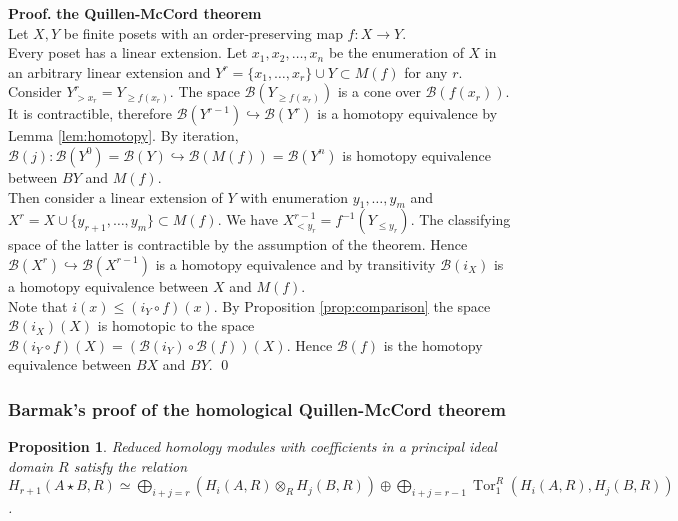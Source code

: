 \documentclass[english,12pt]{article}
\newcounter{stmcounter}[section]
\numberwithin{equation}{section}
\newtheorem{proposition}[stmcounter]{Proposition}
\theoremstyle{definition}
\theoremstyle{remark}
\newenvironment{pf}{\noindent\textbf{Proof.}}{\qed}
\renewcommand{\geq}{\geqslant}
\begin{document}
\begin{pf} \textbf{the Quillen-McCord theorem}\\
  Let $X, Y$ be finite posets with an order-preserving map $f : X \to Y$.\\

  Every poset has a linear extension. Let $x_1, x_2, \ldots, x_n$ be the enumeration of $X$ in an arbitrary linear extension and $Y^r = \{x_1,\ldots,x_r\} \cup Y \subset M(f)$ for any $r$.\\

  Consider $Y^r_{>x_r} = Y_{\geq f(x_r)}$. The space $\mathcal{B}(Y_{\geq f(x_r)})$ is a cone over $\mathcal{B}(f(x_r))$. It is contractible, therefore $\mathcal{B}(Y^{r-1}) \hookrightarrow \mathcal{B}(Y^{r})$ is a homotopy equivalence by Lemma \ref{lem:homotopy}. By iteration, $\mathcal{B}(j) : \mathcal{B}(Y^{0}) = \mathcal{B}(Y) \hookrightarrow \mathcal{B}(M(f)) = \mathcal{B}(Y^n)$ is homotopy equivalence between $BY$ and $M(f)$.\\

  Then consider a linear extension of $Y$ with enumeration $y_1,\ldots,y_m$ and $X^r = X \cup \{y_{r+1},\ldots,y_m\} \subset M(f)$. We have $X^{r-1}_{< y_r} = f^{-1}(Y_{\leqslant y_r})$. The classifying space of the latter is contractible by the assumption of the theorem. Hence $\mathcal{B}(X^{r}) \hookrightarrow \mathcal{B}(X^{r-1})$ is a homotopy equivalence and by transitivity $\mathcal{B}(i_X)$ is a homotopy equivalence between $X$ and $M(f)$.\\

  Note that $i(x) \leqslant (i_Y \circ f)(x)$. By Proposition \ref{prop:comparison} the space $\mathcal{B}(i_X)(X)$ is homotopic to the space $\mathcal{B}(i_Y \circ f)(X) = (\mathcal{B}(i_Y) \circ \mathcal{B}(f))(X)$. Hence $\mathcal{B}(f)$ is the homotopy equivalence between $BX$ and $BY$.
\end{pf}

\subsubsection{Barmak's proof of the homological Quillen-McCord theorem}

\begin{proposition} {\cite[Lemma 2.1]{Milnor56}}
  \label{prop:kunneth}
  Reduced homology modules with coefficients in a principal ideal domain $R$ satisfy the relation
  $H_{r+1}(A \star B, R) \simeq \bigoplus_{i+j=r}(H_i(A,R) \otimes_R H_j(B,R)) \oplus \bigoplus_{i+j=r-1} \operatorname{Tor}_1^R(H_i(A,R),H_j(B,R))$.
\end{proposition}
\end{document}
